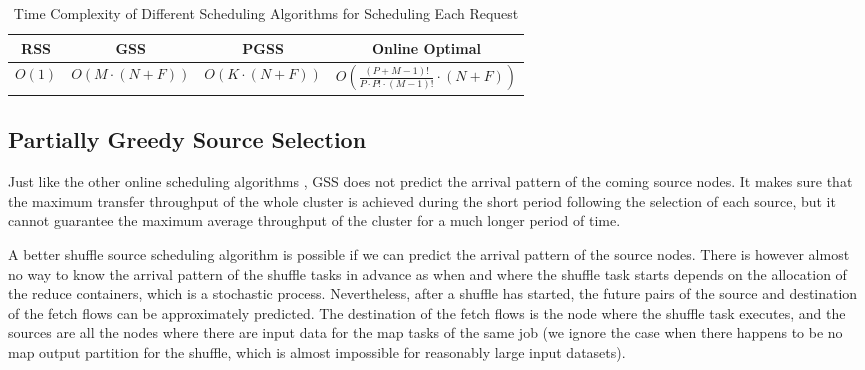 \documentclass[10pt,journal,compsoc]{IEEEtran}
\begin{document}
\begin{table}[!t]
\renewcommand{\arraystretch}{1}
\setlength\tabcolsep{1.5pt}
\caption{Time Complexity of Different Scheduling Algorithms for Scheduling Each Request}
\label{table:complexity}
\centering
\begin{tabularx}{.47\textwidth}{c|c|c|c}
\hline
\textbf{RSS} & \textbf{GSS} & \textbf{PGSS} &\textbf{Online Optimal}\\
\hline
$O(1)$ & $O(M \cdot (N+F))$ &
$O(K \cdot (N+F))$ &$O(\frac{(P+M-1)!}{P \cdot P! \cdot(M-1)!} \cdot (N+F))$\\
\hline
\end{tabularx}
\end{table}

\subsection{Partially Greedy Source Selection}
Just like the other online scheduling algorithms \cite{wu2007scheduling, sgall1998line}, 
GSS does not predict the arrival pattern of the coming source nodes. 
It makes sure that the maximum transfer throughput of the whole
cluster is achieved during the short period
following the selection of each source,
but it cannot guarantee the maximum average throughput of the cluster
for a much longer period of time.

A better shuffle source scheduling algorithm is possible if we can
predict the arrival pattern of the source nodes. %
There is however almost no way to know the arrival pattern of the shuffle
tasks in advance
as when and where the shuffle task starts depends on the allocation of
the reduce containers, which is a stochastic process.
Nevertheless, after a shuffle has started, the future pairs of the
source and destination of the fetch flows can be approximately predicted.
The destination of the fetch flows is the node where the shuffle task
executes,
and the sources are all the nodes where there are input data for the
map tasks of the same job
(we ignore the case when there happens to be no map output partition
for the shuffle, which is almost impossible
for reasonably large input datasets). 
\end{document}
